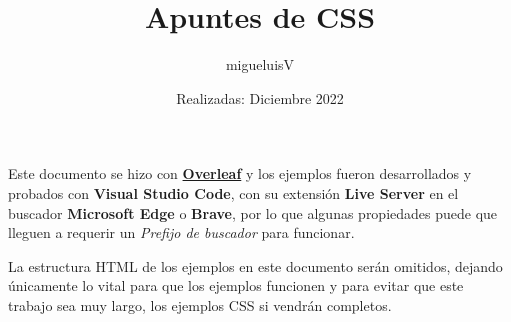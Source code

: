 \documentclass[12pt]{article}
\title{Apuntes de CSS}
\author{migueluisV}
\date{Realizadas: Diciembre 2022}
\begin{document}
\renewcommand*\contentsname{Índice}
\renewcommand{\listtablename}{Índice de Tablas}
\renewcommand{\listfigurename}{Índice de Figuras}

\maketitle\newpage
\tableofcontents\newpage
\listoffigures\newpage
\listoftables\newpage

\hspace{0.55cm}Este documento se hizo con \href{https://es.overleaf.com/}{\textbf{Overleaf}} y los ejemplos fueron desarrollados y probados con \textbf{Visual Studio Code}, con su extensión \textbf{Live Server} en el buscador \textbf{Microsoft Edge} o \textbf{Brave}, por lo que algunas propiedades puede que lleguen a requerir un \textit{Prefijo de buscador} para funcionar.

\sloppy La estructura HTML de los ejemplos en este documento serán omitidos, dejando únicamente lo vital para que los ejemplos funcionen y para evitar que este trabajo sea muy largo, los ejemplos CSS si vendrán completos.










\end{document}
